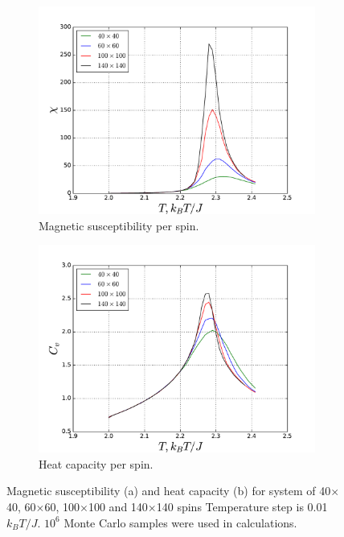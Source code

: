\documentclass[10pt]{article}
\begin{document}
\newpage
\begin{figure}
\centering
   \begin{subfigure}[b]{1\textwidth}
   \includegraphics[width=0.9\linewidth]{phase_10_6_susceptability}
   \caption{Magnetic susceptibility per spin.}
   \label{fig:phase_suscept} 
\end{subfigure}

\begin{subfigure}[b]{1\textwidth}
   \includegraphics[width=0.9\linewidth]{phase_10_6_heat_capacity}
   \caption{Heat capacity per spin.}
   \label{fig:phase_heat_cap}
\end{subfigure}

\caption{Magnetic susceptibility (a) and heat capacity (b) for system of 40$\times$40, 60$\times$60, 100$\times$100 and 140$\times$140 spins
Temperature step is 0.01 $k_BT/J$. $10^6$ Monte Carlo samples were used in calculations.}
\end{figure}
\end{document}
